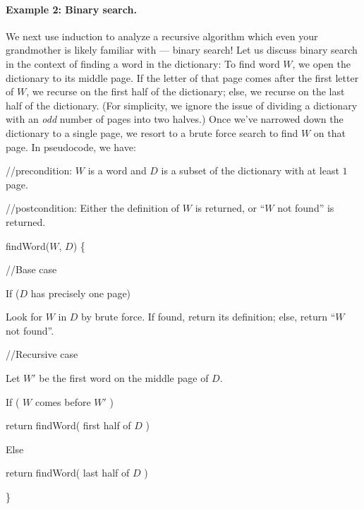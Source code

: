 \documentclass[11pt]{article}
\newcounter{thm}
\begin{document}
\paragraph{Example 2: Binary search.} We next use induction to analyze a recursive algorithm which even your grandmother is likely familiar with --- binary search! Let us discuss binary search in the context of finding a word in the dictionary: To find word $W$, we open the dictionary to its middle page. If the letter of that page comes after the first letter of $W$, we recurse on the first half of the dictionary; else, we recurse on the last half of the dictionary. (For simplicity, we ignore the issue of dividing a dictionary with an \emph{odd} number of pages into two halves.) Once we've narrowed down the dictionary to a single page, we resort to a brute force search to find $W$ on that page. In pseudocode, we have:
\begin{compactenum}
            \item //precondition:  $W$ is a word and $D$ is a subset of the dictionary with at least $1$ page.
            \item //postcondition: Either the definition of $W$ is returned, or ``$W$ not found'' is returned.
            \item findWord($W$, $D$) \{
            \item \mbox{\hspace{5mm}} //Base case
            \item \mbox{\hspace{5mm}} If ($D$ has precisely one page)
            \item \mbox{\hspace{10mm}} Look for $W$ in $D$ by brute force. If found, return its definition; else, return ``$W$ not found''.
            \item
            \item \mbox{\hspace{5mm}} //Recursive case
            \item \mbox{\hspace{5mm}} Let $W'$ be the first word on the middle page of $D$.
            \item \mbox{\hspace{5mm}} If ( $W$ comes before $W'$ )
            \item \mbox{\hspace{10mm}}return findWord( first half of $D$ )
            \item \mbox{\hspace{5mm}} Else
            \item \mbox{\hspace{10mm}}return findWord( last half of $D$ )
            \item \}
\end{compactenum}
\end{document}
